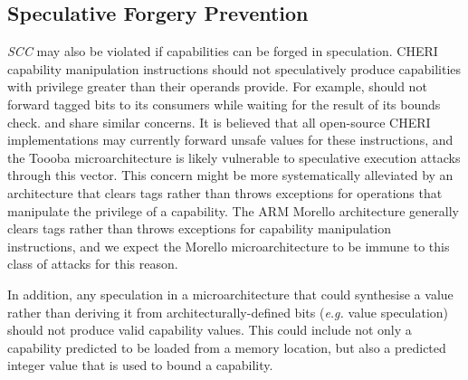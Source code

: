 
\subsection{Speculative Forgery Prevention}
\emph{SCC} may also be violated if capabilities can be forged in speculation.
CHERI capability manipulation instructions should not speculatively produce capabilities with privilege greater than their operands provide.
For example,  should not forward tagged bits to its consumers while waiting for the result of its bounds check.
 and  share similar concerns.
It is believed that all open-source CHERI implementations may currently forward unsafe values for these instructions, and the Toooba microarchitecture is likely vulnerable to speculative execution attacks through this vector.
This concern might be more systematically alleviated by an architecture that clears tags rather than throws exceptions for operations that manipulate the privilege of a capability. The ARM Morello architecture generally clears tags rather than throws exceptions for capability manipulation instructions, and we expect the Morello microarchitecture to be immune to this class of attacks for this reason.

In addition, any speculation in a microarchitecture that could synthesise a value rather than deriving it from architecturally-defined bits (\textit{e.g.} value speculation) should not produce valid capability values.
This could include not only a capability predicted to be loaded from a memory location, but also a predicted integer value that is used to bound a capability.

